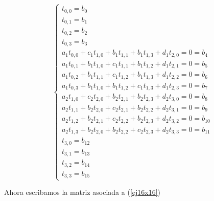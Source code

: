 \begin{equation}
\label{ej16x16}
  \left\lbrace
  \begin{array}{l}
     t_{0,0} = b_0 \\
     t_{0,1} = b_1 \\
     t_{0,2} = b_2 \\
     t_{0,3} = b_3 \\
		 a_1 t_{0,0} + c_1 t_{1,0} + b_1 t_{1, 1} + b_1 t_{1, 3} + d_1 t_{2,0} 		= 0 = b_{4}	\\
		 a_1 t_{0,1} + b_1 t_{1,0} + c_1 t_{1,1} + b_1 t_{1,2} + d_1 t_{2,1} 		 	= 0 = b_{5}	\\
	   a_1 t_{0,2} + b_1 t_{1,1} + c_1 t_{1,2} + b_1 t_{1,3} + d_1 t_{2,2} 			= 0 = b_{6}	\\
		 a_1 t_{0,3} + b_1 t_{1,0} + b_1 t_{1,2} + c_1 t_{1,3} + d_1 t_{2,3} 			= 0 = b_{7}	\\
		 a_2 t_{1,0} + c_2 t_{2,0} + b_2 t_{2,1} + b_2 t_{2,3} + d_2 t_{3,0}			= 0 = b_{8}	\\
		 a_2 t_{1,1} + b_2 t_{2,0} + c_2 t_{2,1} + b_2 t_{2,2} + d_2 t_{3,1} 		 	= 0 = b_{9}	\\
	   a_2 t_{1,2} + b_2 t_{2,1} + c_2 t_{2,2} + b_2 t_{2,3} + d_2 t_{3,2} 			= 0 = b_{10}	\\
		 a_2 t_{1,3} + b_2 t_{2,0} + b_2 t_{2,2} + c_2 t_{2,3} + d_2 t_{3,3} 			= 0 = b_{11}	\\
     t_{3,0} = b_{12} \\
     t_{3,1} = b_{13} \\
     t_{3,2} = b_{14} \\
     t_{3,3} = b_{15}     		 
  \end{array}
  \right.
\end{equation}

Ahora escribamos la matriz asociada a (\ref{ej16x16}) \vspace{1em}

